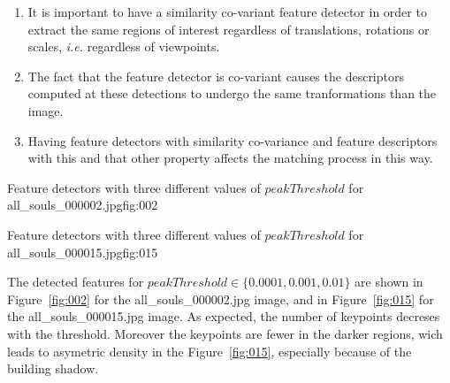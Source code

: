 \documentclass{article}
\begin{document}
\maketitle


\begin{enumerate}
	\item It is important to have a similarity co-variant feature detector in order to extract the same regions of interest regardless of translations, rotations or scales, \textit{i.e.} regardless of viewpoints.
	\item The fact that the feature detector is co-variant causes the descriptors computed at these detections to undergo the same tranformations than the image.
	\item Having feature detectors with similarity co-variance and feature descriptors with this and that other property affects the matching process in this way.
\end{enumerate}


{}
{}
{Feature detectors with three different values of \(peakThreshold\) for all\_souls\_000002.jpg}{fig:002}

{}
{}
{Feature detectors with three different values of \(peakThreshold\) for all\_souls\_000015.jpg}{fig:015}

The detected features for \(peakThreshold \in \{0.0001, 0.001, 0.01\}\) are shown in Figure~\ref{fig:002} for the all\_souls\_000002.jpg image, and in Figure~\ref{fig:015} for the all\_souls\_000015.jpg image. As expected, the number of keypoints decreses with the threshold. Moreover the keypoints are fewer in the darker regions, wich leads to asymetric density in the Figure~\ref{fig:015}, especially because of the building shadow.
\end{document}

